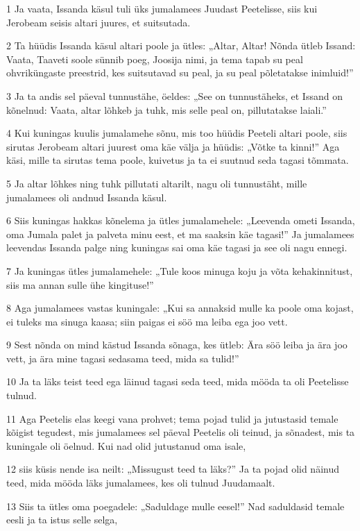 \par 1 Ja vaata, Issanda käsul tuli üks jumalamees Juudast Peetelisse, siis kui Jerobeam seisis altari juures, et suitsutada.
\par 2 Ta hüüdis Issanda käsul altari poole ja ütles: „Altar, Altar! Nõnda ütleb Issand: Vaata, Taaveti soole sünnib poeg, Joosija nimi, ja tema tapab su peal ohvriküngaste preestrid, kes suitsutavad su peal, ja su peal põletatakse inimluid!”
\par 3 Ja ta andis sel päeval tunnustähe, öeldes: „See on tunnustäheks, et Issand on kõnelnud: Vaata, altar lõhkeb ja tuhk, mis selle peal on, pillutatakse laiali.”
\par 4 Kui kuningas kuulis jumalamehe sõnu, mis too hüüdis Peeteli altari poole, siis sirutas Jerobeam altari juurest oma käe välja ja hüüdis: „Võtke ta kinni!” Aga käsi, mille ta sirutas tema poole, kuivetus ja ta ei suutnud seda tagasi tõmmata.
\par 5 Ja altar lõhkes ning tuhk pillutati altarilt, nagu oli tunnustäht, mille jumalamees oli andnud Issanda käsul.
\par 6 Siis kuningas hakkas kõnelema ja ütles jumalamehele: „Leevenda ometi Issanda, oma Jumala palet ja palveta minu eest, et ma saaksin käe tagasi!” Ja jumalamees leevendas Issanda palge ning kuningas sai oma käe tagasi ja see oli nagu ennegi.
\par 7 Ja kuningas ütles jumalamehele: „Tule koos minuga koju ja võta kehakinnitust, siis ma annan sulle ühe kingituse!”
\par 8 Aga jumalamees vastas kuningale: „Kui sa annaksid mulle ka poole oma kojast, ei tuleks ma sinuga kaasa; siin paigas ei söö ma leiba ega joo vett.
\par 9 Sest nõnda on mind kästud Issanda sõnaga, kes ütleb: Ära söö leiba ja ära joo vett, ja ära mine tagasi sedasama teed, mida sa tulid!”
\par 10 Ja ta läks teist teed ega läinud tagasi seda teed, mida mööda ta oli Peetelisse tulnud.
\par 11 Aga Peetelis elas keegi vana prohvet; tema pojad tulid ja jutustasid temale kõigist tegudest, mis jumalamees sel päeval Peetelis oli teinud, ja sõnadest, mis ta kuningale oli öelnud. Kui nad olid jutustanud oma isale,
\par 12 siis küsis nende isa neilt: „Missugust teed ta läks?” Ja ta pojad olid näinud teed, mida mööda läks jumalamees, kes oli tulnud Juudamaalt.
\par 13 Siis ta ütles oma poegadele: „Saduldage mulle eesel!” Nad saduldasid temale eesli ja ta istus selle selga,
